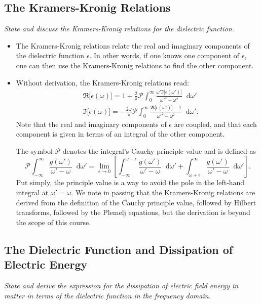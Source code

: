 \documentclass[11pt, a4paper]{article}
\newcommand{\diff}{\mathop{}\!\mathrm{d}} %
\begin{document}
    
\subsection{The Kramers-Kronig Relations}
\textit{State and discuss the Kramers-Kronig relations for the dielectric function.}
\begin{itemize}
    \item The Kramers-Kronig relations relate the real and imaginary components of the dielectric function $ \epsilon $. In other words, if one knows one component of $ \epsilon $, one can then use the Kramers-Kronig relations to find the other component.

    \item Without derivation, the Kramers-Kronig relations read:
    \begin{align*}
        & \Re \big[\epsilon(\omega)\big ] = 1 + \frac{2}{\pi} \mathcal{P} \int_{0}^{\infty} \frac{\omega' \Im \big[ \epsilon(\omega') \big]}{\omega'^{2} - \omega^{2}} \diff \omega'\\
        & \Im \big[ \epsilon(\omega) \big] = - \frac{2\omega}{\pi} \mathcal{P} \int_{0}^{\infty} \frac{ \Re \big[ \epsilon(\omega')  \big]- 1}{\omega'^{2} - \omega^{2}} \diff \omega'.
    \end{align*}
    Note that the real and imaginary components of $ \epsilon $ are coupled, and that each component is given in terms of an integral of the other component.

    The symbol $ \mathcal{P} $ denotes the integral's Cauchy principle value and is defined as 
    \begin{equation*}
        \mathcal{P}\int_{-\infty}^{\infty} \frac{g(\omega')}{\omega' - \omega} \diff \omega' = \lim_{\epsilon \to 0} \left[ \int_{-\infty}^{\omega-\epsilon} \frac{g(\omega')}{\omega'-\omega}\diff \omega' + \int_{\omega+\epsilon}^{\infty} \frac{g(\omega')}{\omega'-\omega}\diff \omega' \right].
    \end{equation*}
    Put simply, the principle value is a way to avoid the pole in the left-hand integral at $ \omega' = \omega $. We note in passing that the Kramers-Kronig relations are derived from the definition of the Cauchy principle value, followed by Hilbert transforms, followed by the Plemelj equations, but the derivation is beyond the scope of this course.

\end{itemize}

    
\subsection{The Dielectric Function and Dissipation of Electric Energy}
\textit{State and derive the expression for the dissipation of electric field energy in matter in terms of the dielectric function in the frequency domain.}
\end{document}

